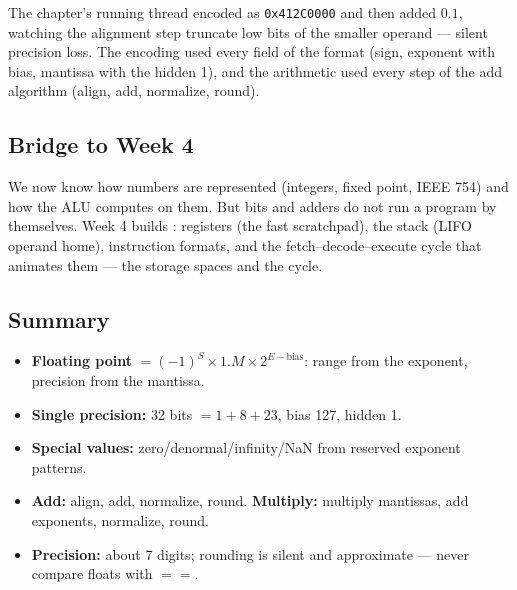 \documentclass[11pt]{article}
\begin{document}
The chapter's running thread encoded  as \texttt{0x412C0000} and then added $0.1$, watching the alignment step truncate low bits of the smaller operand --- silent precision loss. The encoding used every field of the format (sign, exponent with bias, mantissa with the hidden 1), and the arithmetic used every step of the add algorithm (align, add, normalize, round).

\subsection{Bridge to Week 4}

We now know how numbers are represented (integers, fixed point, IEEE 754) and how the ALU computes on them. But bits and adders do not run a program by themselves. Week 4 builds : registers (the fast scratchpad), the stack (LIFO operand home), instruction formats, and the fetch--decode--execute cycle that animates them --- the storage spaces and the cycle.

\subsection{Summary}

\begin{itemize}
  \item \textbf{Floating point} $= (-1)^S \times 1.M \times 2^{E-\text{bias}}$: range from the exponent, precision from the mantissa.
  \item \textbf{Single precision:} 32 bits $= 1 + 8 + 23$, bias 127, hidden 1.
  \item \textbf{Special values:} zero/denormal/infinity/NaN from reserved exponent patterns.
  \item \textbf{Add:} align, add, normalize, round. \textbf{Multiply:} multiply mantissas, add exponents, normalize, round.
  \item \textbf{Precision:} about 7 digits; rounding is silent and approximate --- never compare floats with $==$.
\end{itemize}



\end{document}
